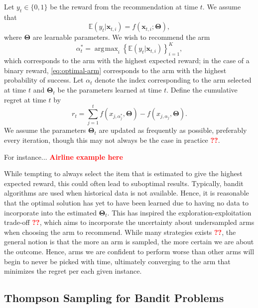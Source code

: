 \documentclass[12pt]{article}
\newcommand{\bred}[1]{\textbf{\textcolor{red}{#1}}}
\DeclareMathOperator*{\argmax}{\arg\!\max}
\begin{document}
Let $y_t \in \{0,1\}$ be the reward from the recommendation at time $t$. 
We assume that 
\begin{equation}
\mathbb{E}(y_t \vert \bm{x}_{t,i}) = f(\bm{x}_{t,i}; \bm{\Theta}),
\end{equation}
where $\bm{\Theta}$ are learnable parameters.
We wish to recommend the arm 
\begin{equation}
\alpha_t^* = \argmax_i \left\{\mathbb{E}(y_t \vert \bm{x}_{t,i})\right\}_{i = 1}^K,
\label{eq:optimal-arm}
\end{equation}
which corresponds to the arm with the highest expected reward; in the case of 
a binary reward, \eqref{eq:optimal-arm} corresponds to the arm with the highest 
probability of success.  
Let $\alpha_t$ denote the index corresponding to the arm selected at time $t$ and 
$\bm{\Theta}_t$ be the parameters learned at time $t$.
Define the cumulative regret at time $t$ by
\begin{equation}
r_t = \sum_{j = 1}^{t} 
f(x_{j, \alpha_j^*}, \bm{\Theta}) 
- f(x_{j, \alpha_j}, \bm{\Theta}).
\label{eq:regret}
\end{equation}
We assume the parameters $\bm{\Theta}_t$ are updated as frequently as 
possible, preferably every iteration, though this may not always be the case in 
practice \bred{??}.

For instance... \bred{Airline example here}

While tempting to always select the item that is estimated to give the highest
expected reward, this could often lead to suboptimal results.
Typically, bandit algorithms are used when historical data is not available.  
Hence, it is reasonable that the optimal solution has yet to have been learned due
to having no data to incorporate into the estimated $\bm{\Theta}_t$.
This has inspired the exploration-exploitation trade-off \bred{??}, which aims to
incorporate the uncertainty about undersampled arms when choosing the arm to 
recommend.
While many strategies exists \bred{??}, the general notion is that the more an 
arm is sampled, the more certain we are about the outcome. 
Hence, arms we are confident to perform worse than other arms will begin to never 
be picked with time, ultimately converging to the arm that minimizes the regret 
per each given instance.

\subsection{Thompson Sampling for Bandit Problems}
\end{document}
